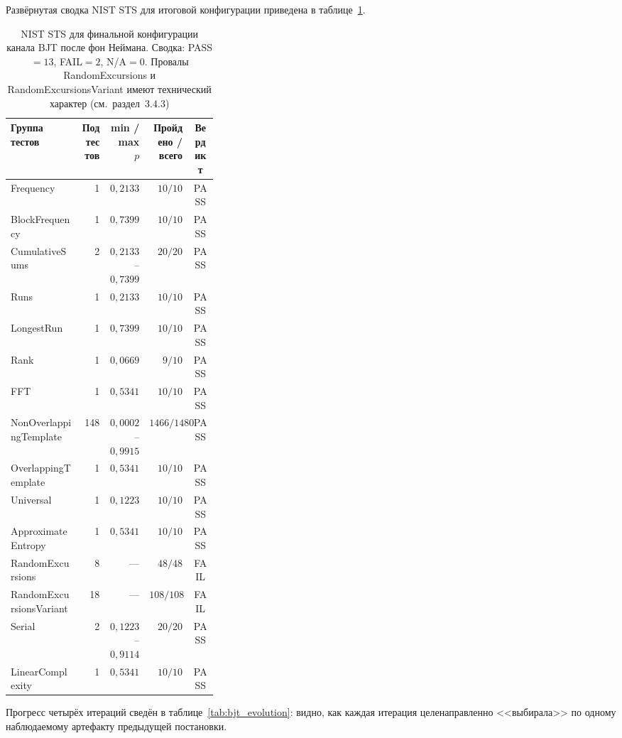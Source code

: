 Развёрнутая сводка NIST STS для итоговой конфигурации приведена в
таблице~\ref{tab:bjt_stage4_nist}.

\begin{table}[H]
  \centering
  \footnotesize
  \caption{NIST STS для финальной конфигурации канала BJT после фон Неймана.
  Сводка: PASS${}=13$, FAIL${}=2$, N/A${}=0$. Провалы RandomExcursions и
  RandomExcursionsVariant имеют технический характер (см.~раздел~3.4.3)}
  \label{tab:bjt_stage4_nist}
  \begin{tabular}{|p{0.34\linewidth}|r|r|r|c|}
    \hline
    Группа тестов & Под\-тестов & min / max $p$ & Пройдено / всего & Вердикт \\
    \hline
    Frequency & 1 & $0{,}2133$ & $10/10$ & PASS \\
    \hline
    BlockFrequency & 1 & $0{,}7399$ & $10/10$ & PASS \\
    \hline
    CumulativeSums & 2 & $0{,}2133$ -- $0{,}7399$ & $20/20$ & PASS \\
    \hline
    Runs & 1 & $0{,}2133$ & $10/10$ & PASS \\
    \hline
    LongestRun & 1 & $0{,}7399$ & $10/10$ & PASS \\
    \hline
    Rank & 1 & $0{,}0669$ & $9/10$ & PASS \\
    \hline
    FFT & 1 & $0{,}5341$ & $10/10$ & PASS \\
    \hline
    NonOverlappingTemplate & 148 & $0{,}0002$ -- $0{,}9915$ & $1466/1480$ & PASS \\
    \hline
    OverlappingTemplate & 1 & $0{,}5341$ & $10/10$ & PASS \\
    \hline
    Universal & 1 & $0{,}1223$ & $10/10$ & PASS \\
    \hline
    ApproximateEntropy & 1 & $0{,}5341$ & $10/10$ & PASS \\
    \hline
    RandomExcursions & 8 & --- & $48/48$ & FAIL \\
    \hline
    RandomExcursionsVariant & 18 & --- & $108/108$ & FAIL \\
    \hline
    Serial & 2 & $0{,}1223$ -- $0{,}9114$ & $20/20$ & PASS \\
    \hline
    LinearComplexity & 1 & $0{,}5341$ & $10/10$ & PASS \\
    \hline
  \end{tabular}
\end{table}


Прогресс четырёх итераций сведён в таблице~\ref{tab:bjt_evolution}: видно, как каждая
итерация целенаправленно <<выбирала>> по одному наблюдаемому артефакту предыдущей
постановки.

